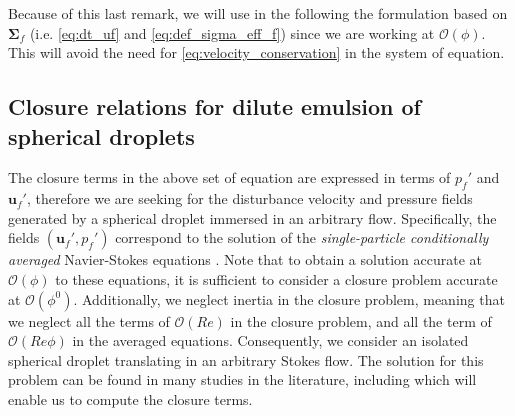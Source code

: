 Because of this last remark, we will use in the following the formulation based on $\bm\Sigma_f$ (i.e. \ref{eq:dt_uf} and \ref{eq:def_sigma_eff_f}) since we are working at $\mathcal{O}(\phi)$.
This will avoid the need for \ref{eq:velocity_conservation} in the system of equation. 




\subsection{Closure relations for dilute emulsion of spherical droplets}

The closure terms in the above set of equation are expressed in terms of $p_f'$ and $\textbf{u}_f'$, therefore we are seeking for the disturbance velocity and pressure fields generated by a spherical droplet immersed in an arbitrary flow. 
Specifically, the fields $(\textbf{u}_f',p_f')$ correspond to the solution of the 
 \textit{single-particle conditionally averaged} Navier-Stokes equations \citep{hinch1977averaged,zhang1994averaged} . 
Note that to obtain a solution accurate at $\mathcal{O}(\phi)$ to these equations, it is sufficient to consider a closure problem accurate at $\mathcal{O}(\phi^0)$\citep{hinch1977averaged,zhang1994averaged}.
Additionally, we neglect inertia in the closure problem, meaning that we neglect all the terms of $\mathcal{O}(Re)$ in the closure problem, and all the term of $\mathcal{O}(Re\phi)$ in the averaged equations. 
Consequently, we consider an isolated spherical droplet translating in an arbitrary Stokes flow.
The solution for this problem can be found in many studies in the literature, including \citet{leal2007advanced,pozrikidis1992boundary,kim2013microhydrodynamics,pozrikidis2011introduction} which will enable us to compute the closure terms.

